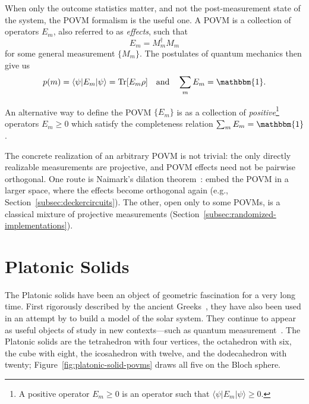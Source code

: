 \documentclass[11pt, oneside, openany]{scrbook}
\DeclareMathOperator{\Tr}{Tr}
\newcommand{\Id}{\mathbbm{1}}
\newcommand{\ket}[1]{|#1\rangle}
\newcommand{\bra}[1]{\langle#1|}
\begin{document}
When only the outcome statistics matter, and not the post-measurement state of the system, the POVM formalism is the useful one. A POVM is a collection of operators ${E_m}$, also referred to as \textit{effects}, such that $$E_m = M_m^\dagger M_m$$ for some general measurement $\{M_m\}$. The postulates of quantum mechanics then give us $$p(m) = \bra{\psi} E_m \ket{\psi} = \Tr[E_m \rho] \quad \text{and} \quad \sum_m E_m = \Id .$$

An alternative way to define the POVM $\{E_m\}$ is as a collection of \textit{positive}\footnote{A positive operator $E_m \ge 0$ is an operator such that $\bra{\psi} E_m \ket{\psi} \ge 0.$} operators $E_m \ge 0$ which satisfy the completeness relation $\sum_m E_m = \Id$.

The concrete realization of an arbitrary POVM is not trivial: the only directly realizable measurements are projective, and POVM effects need not be pairwise orthogonal. One route is Naimark’s dilation theorem~\cite[Thm.~2.42]{watrous2018theoryquantuminformation}: embed the POVM in a larger space, where the effects become orthogonal again (e.g., Section~\ref{subsec:deckercircuits}). The other, open only to some POVMs, is a classical mixture of projective measurements (Section~\ref{subsec:randomized-implementations}).

\section{Platonic Solids} \label{sec:platonic-solids}

The Platonic solids have been an object of geometric fascination for a very long time. First rigorously described by the ancient Greeks~\cite[Book~XIII]{euclid1956thirteenbookseuclids}, they have also been used in an attempt by \textcite{kepler1596prodromusdissertationumcosmographicarum} to build a model of the solar system. They continue to appear as useful objects of study in new contexts---such as quantum measurement~\cite{tavakoli2020platonicsolidsfundamental}. The Platonic solids are the tetrahedron with four vertices, the octahedron with six, the cube with eight, the icosahedron with twelve, and the dodecahedron with twenty; Figure~\ref{fig:platonic-solid-povms} draws all five on the Bloch sphere.
\end{document}
